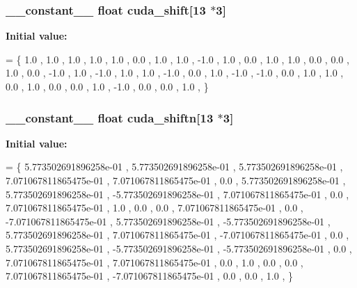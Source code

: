 \hypertarget{runner__cuda_8cu_a1f84d7a25177e2cc11d37f2f52d0944c}{
\subsubsection[{cuda\-\_\-shift}]{\setlength{\rightskip}{0pt plus 5cm}\-\_\-\-\_\-constant\-\_\-\-\_\- float cuda\-\_\-shift\mbox{[}13 $\ast$3\mbox{]}}}\label{runner__cuda_8cu_a1f84d7a25177e2cc11d37f2f52d0944c}
{\bfseries Initial value\-:}
\begin{DoxyCode}
= \{
     1.0 ,  1.0 ,  1.0 ,
     1.0 ,  1.0 ,  0.0 ,
     1.0 ,  1.0 , -1.0 ,
     1.0 ,  0.0 ,  1.0 ,
     1.0 ,  0.0 ,  0.0 ,
     1.0 ,  0.0 , -1.0 ,
     1.0 , -1.0 ,  1.0 ,
     1.0 , -1.0 ,  0.0 ,
     1.0 , -1.0 , -1.0 ,
     0.0 ,  1.0 ,  1.0 ,
     0.0 ,  1.0 ,  0.0 ,
     0.0 ,  1.0 , -1.0 ,
     0.0 ,  0.0 ,  1.0 ,
    \}
\end{DoxyCode}
\hypertarget{runner__cuda_8cu_a286561d77721b876ea4262816551ce07}{
\subsubsection[{cuda\-\_\-shiftn}]{\setlength{\rightskip}{0pt plus 5cm}\-\_\-\-\_\-constant\-\_\-\-\_\- float cuda\-\_\-shiftn\mbox{[}13 $\ast$3\mbox{]}}}\label{runner__cuda_8cu_a286561d77721b876ea4262816551ce07}
{\bfseries Initial value\-:}
\begin{DoxyCode}
= \{
     5.773502691896258e-01 ,  5.773502691896258e-01 ,  5.773502691896258e-01 ,
     7.071067811865475e-01 ,  7.071067811865475e-01 ,  0.0                   ,
     5.773502691896258e-01 ,  5.773502691896258e-01 , -5.773502691896258e-01 ,
     7.071067811865475e-01 ,  0.0                   ,  7.071067811865475e-01 ,
     1.0                   ,  0.0                   ,  0.0                   ,
     7.071067811865475e-01 ,  0.0                   , -7.071067811865475e-01 ,
     5.773502691896258e-01 , -5.773502691896258e-01 ,  5.773502691896258e-01 ,
     7.071067811865475e-01 , -7.071067811865475e-01 ,  0.0                   ,
     5.773502691896258e-01 , -5.773502691896258e-01 , -5.773502691896258e-01 ,
     0.0                   ,  7.071067811865475e-01 ,  7.071067811865475e-01 ,
     0.0                   ,  1.0                   ,  0.0                   ,
     0.0                   ,  7.071067811865475e-01 , -7.071067811865475e-01 ,
     0.0                   ,  0.0                   ,  1.0                   ,
     \}
\end{DoxyCode}

